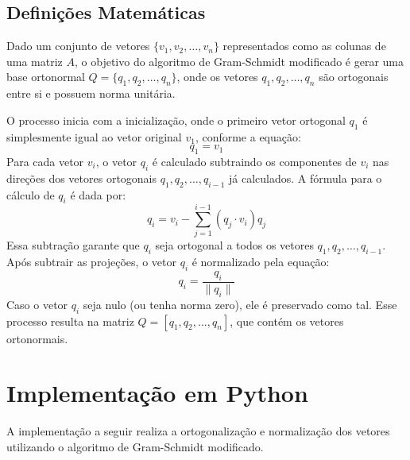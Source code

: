 \subsection{Definições Matemáticas}

Dado um conjunto de vetores \( \{v_1, v_2, \dots, v_n\} \) representados como as colunas de uma matriz \( A \), o objetivo do algoritmo de Gram-Schmidt modificado é gerar uma base ortonormal \( Q = \{q_1, q_2, \dots, q_n\} \), onde os vetores \( q_1, q_2, \dots, q_n \) são ortogonais entre si e possuem norma unitária.

O processo inicia com a inicialização, onde o primeiro vetor ortogonal \( q_1 \) é simplesmente igual ao vetor original \( v_1 \), conforme a equação:
\begin{equation}
  q_1 = v_1
\end{equation}
Para cada vetor \( v_i \), o vetor \( q_i \) é calculado subtraindo os componentes de \( v_i \) nas direções dos vetores ortogonais \( q_1, q_2, \dots, q_{i-1} \) já calculados. A fórmula para o cálculo de \( q_i \) é dada por:
\begin{equation}
  q_i = v_i - \sum_{j=1}^{i-1} (q_j \cdot v_i) q_j
\end{equation}
Essa subtração garante que \( q_i \) seja ortogonal a todos os vetores \( q_1, q_2, \dots, q_{i-1} \). Após subtrair as projeções, o vetor \( q_i \) é normalizado pela equação:
\begin{equation}
  q_i = \frac{q_i}{\|q_i\|}
\end{equation}
Caso o vetor \( q_i \) seja nulo (ou tenha norma zero), ele é preservado como tal.
Esse processo resulta na matriz \( Q = [q_1, q_2, \dots, q_n] \), que contém os vetores ortonormais.

\section{Implementação em Python}

A implementação a seguir realiza a ortogonalização e normalização dos vetores utilizando o algoritmo de Gram-Schmidt modificado.

